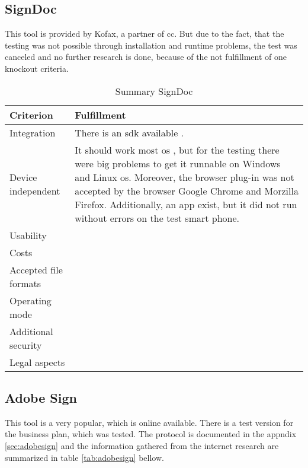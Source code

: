 \subsection{SignDoc}
This tool is provided by Kofax, a partner of \gls{cc}. But due to the fact, that the testing was not possible through installation and runtime problems, the test was canceled and no further research is done, because of the not fulfillment of one knockout criteria. 

\begin{table}[h!]
	\begin{tabular}{|p{4cm}|p{10cm}|} \hline
		Criterion & Fulfillment \\ \hline
		Integration & There is an \gls{sdk} available \parencite{kofax2018sdk}. \\ \hline
		Device independent & It should work most \gls{os} \parencite{kofax2018sdk}, but for the testing there were big problems to get it runnable on Windows and Linux \gls{os}. Moreover, the browser plug-in was not accepted by the browser Google Chrome and Morzilla Firefox. Additionally, an \gls{app} exist, but it did not run without errors on the test smart phone. \\ \hline
		Usability & \\ \hline
		Costs & \\ \hline
		Accepted file formats & \\ \hline
		Operating mode & \\ \hline
		Additional security & \\ \hline
		Legal aspects & \\ \hline
	\end{tabular}
	\caption{Summary SignDoc}
	\label{tab:signdoc}
\end{table}

\subsection{Adobe Sign}
This tool is a very popular, which is online available. There is a test version for the business plan, which was tested. The protocol is documented in the appndix \ref{sec:adobesign} and the information gathered from the internet research are summarized in table \ref{tab:adobesign} bellow. 
	
